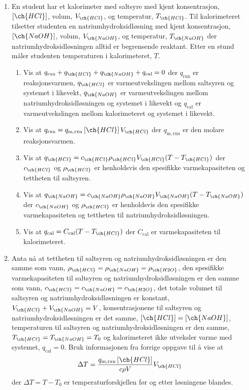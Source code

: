 \begin{enumerate}[label=\alph*)]
		\item En student har et kalorimeter med saltsyre med kjent konsentrasjon, $\left[\ch{HCl}\right]$, volum, $V_{\ch{HCl}}$, og temperatur, $T_{\ch{HCl}}$.
		Til kalorimeteret tilsetter studenten en natriumhydroksidløsning med kjent konsentrasjon, $\left[\ch{NaOH}\right]$, volum, $V_{\ch{NaOH}}$, og temperatur, 	$T_{\ch{NaOH}}$ der natriumhydroksidløsningen alltid er begrensende reaktant.
		Etter en stund måler studenten temperaturen i kalorimeteret, $T$.
		\begin{enumerate}[label=\roman*)]
			\item Vis at $q_\mathrm{rxn} + q_{\ch{HCl}} + q_{\ch{NaOH}} + q_\mathrm{cal} = 0$ der $q_\mathrm{rxn}$ er reaksjonsvarmen, $q_{\ch{HCl}}$ er varmeutvekslingen mellom saltsyren og systemet i likevekt, $q_{\ch{NaOH}}$ er varmeutvekslingen mellom natriumhydroksidløsningen og systemet i likevekt og $q_\mathrm{cal}$ er varmeutvekslingen mellom kalorimeteret og systemet i likevekt.
			\item Vis at $q_\mathrm{rxn}=q_\mathrm{m, rxn} \left[\ch{HCl}\right] V_{\ch{HCl}}$ der $q_\mathrm{m, rxn}$ er den molare reaksjonsvarmen.
			\item Vis at $q_{\ch{HCl}}=c_{\ch{HCl}}\rho_{\ch{HCl}}V_{\ch{HCl}}(T - T_{\ch{HCl}})$ der $c_{\ch{HCl}}$ og $\rho_{\ch{HCl}}$ er henholdsvis den spesifikke varmekapasiteten og tettheten til saltsyren.
			\item Vis at $q_{\ch{NaOH}}=c_{\ch{NaOH}}\rho_{\ch{NaOH}}V_{\ch{NaOH}}(T - T_{\ch{NaOH}})$ der $c_{\ch{NaOH}}$ og $\rho_{\ch{HCl}}$ er henholdsvis den spesifikke varmekapasiteten og tettheten til natriumhydroksidløsningen.
			\item Vis at $q_\mathrm{cal}=C_\mathrm{cal}(T - T_{\ch{HCl}})$ der $C_\mathrm{cal}$ er varmekapasiteten til kalorimeteret.			
		\end{enumerate}		
		\item Anta nå at tettheten til saltsyren og natriumhydroksidløsningen er den samme som vann, $\rho_{\ch{HCl}}=\rho_{\ch{NaOH}}=\rho_{\ch{H2O}}$, den spesifikke varmekapasiteten til saltsyren og natriumhydroksidløsningen er den samme som vann, $c_{\ch{HCl}}=c_{\ch{NaOH}}=c_{\ch{H2O}}$, det totale volumet til saltsyren og natriumhydroksidløsningen er konstant, $V_{\ch{HCl}} + V_{\ch{NaOH}} = V$, konsentrasjonene til saltsyren og natriumhydroksidløsningen er det samme, $\left[\ch{HCl}\right]=\left[\ch{NaOH}\right]$, temperaturen til saltsyren og natriumhydroksidløsningen er den samme, $T_{\ch{HCl}}
		=T_{\ch{NaOH}}=T_0$ og kalorimeteret ikke utveksler varme med systemet, $q_\mathrm{cal}=0$.
		Bruk informasjonen fra forrige oppgave til å vise at 
		\begin{equation}
			\Delta T = \frac{q_\mathrm{m, rxn}\left[\ch{HCl}\right]}{c\rho V}V_{\ch{HCl}}
		\end{equation}
		der $\Delta T=T - T_0$ er temperaturforskjellen før og etter løsningene blandes.
		

\end{enumerate}
